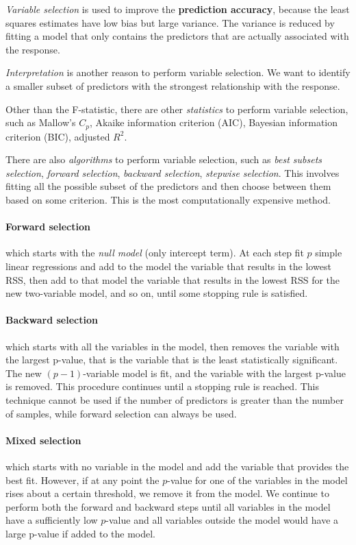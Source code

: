 \textit{Variable selection} is used to improve the \textbf{prediction accuracy}, because the least squares estimates have low bias but large variance. The variance is reduced by fitting a model that only contains the predictors that are actually associated with the response.

\textit{Interpretation} is another reason to perform variable selection. We want to identify a smaller subset of predictors with the strongest relationship with the response.

Other than the F-statistic, there are other \textit{statistics} to perform variable selection, such as Mallow's $C_p$, Akaike information criterion (AIC), Bayesian information criterion (BIC), adjusted $R^2$.

There are also \textit{algorithms} to perform variable selection, such as \textit{best subsets selection}, \textit{forward selection}, \textit{backward selection}, \textit{stepwise selection}. This involves fitting all the possible subset of the predictors and then choose between them based on some criterion. This is the most computationally expensive method.

\paragraph*{Forward selection} which starts with the \textit{null model} (only intercept term). At each step fit $p$ simple linear regressions and add to the model the variable that results in the lowest RSS, then add to that model the variable that results in the lowest RSS for the new two-variable model, and so on, until some stopping rule is satisfied.

\paragraph*{Backward selection} which starts with all the variables in the model, then removes the variable with the largest p-value, that is the variable that is the least statistically significant. The new $(p-1)$-variable model is fit, and the variable with the largest p-value is removed. This procedure continues until a stopping rule is reached. This technique cannot be used if the number of predictors is greater than the number of samples, while forward selection can always be used.

\paragraph*{Mixed selection} which starts with no variable in the model and add the variable that provides the best fit. However, if at any point the $p$-value for one of the variables in the model rises about a certain threshold, we remove it from the model. We continue to perform both the forward and backward steps until all variables in the model have a sufficiently low $p$-value and all variables outside the model would have a large p-value if added to the model.

